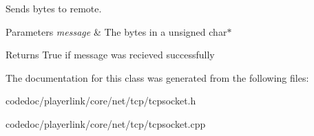 Sends bytes to remote. 


\begin{DoxyParams}{Parameters}
{\em message} & The bytes in a unsigned char$\ast$ \\
\hline
\end{DoxyParams}
\begin{DoxyReturn}{Returns}
True if message was recieved successfully 
\end{DoxyReturn}


The documentation for this class was generated from the following files\+:\begin{DoxyCompactItemize}
\item 
codedoc/playerlink/core/net/tcp/tcpsocket.\+h\item 
codedoc/playerlink/core/net/tcp/tcpsocket.\+cpp\end{DoxyCompactItemize}
